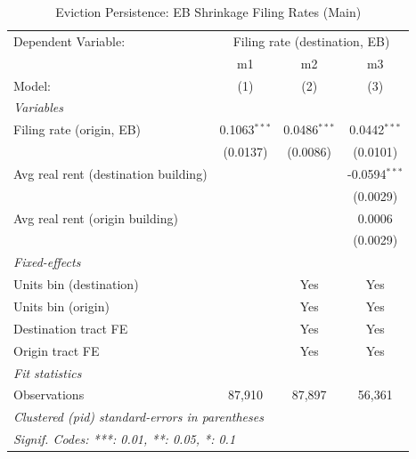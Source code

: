 \begin{table}[htbp]
   \caption{\label{tab:evict_persist} Eviction Persistence: EB Shrinkage Filing Rates (Main)}
   \centering
   \begin{tabular}{lccc}
      \tabularnewline \midrule \midrule
      Dependent Variable: & \multicolumn{3}{c}{Filing rate (destination, EB)}\\
                                           & m1             & m2             & m3 \\   
      Model:                               & (1)            & (2)            & (3)\\  
      \midrule
      \emph{Variables}\\
      Filing rate (origin, EB)             & 0.1063$^{***}$ & 0.0486$^{***}$ & 0.0442$^{***}$\\   
                                           & (0.0137)       & (0.0086)       & (0.0101)\\   
      Avg real rent (destination building) &                &                & -0.0594$^{***}$\\   
                                           &                &                & (0.0029)\\   
      Avg real rent (origin building)      &                &                & 0.0006\\   
                                           &                &                & (0.0029)\\   
      \midrule
      \emph{Fixed-effects}\\
      Units bin (destination)              &                & Yes            & Yes\\  
      Units bin (origin)                   &                & Yes            & Yes\\  
      Destination tract FE                 &                & Yes            & Yes\\  
      Origin tract FE                      &                & Yes            & Yes\\  
      \midrule
      \emph{Fit statistics}\\
      Observations                         & 87,910         & 87,897         & 56,361\\  
      \midrule \midrule
      \multicolumn{4}{l}{\emph{Clustered (pid) standard-errors in parentheses}}\\
      \multicolumn{4}{l}{\emph{Signif. Codes: ***: 0.01, **: 0.05, *: 0.1}}\\
   \end{tabular}
\end{table}
